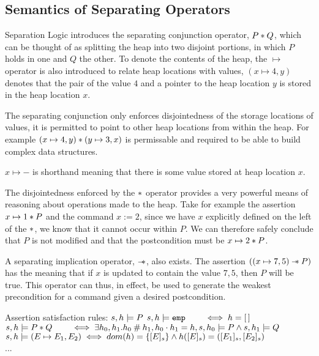 \documentclass[a4paper]{report}
\begin{document}
  \subsection{Semantics of Separating Operators}
  
  Separation Logic introduces the separating conjunction operator, $P \mathbin{*} Q$,
  which can be thought of as splitting the heap into two disjoint portions, in
  which $P$ holds in one and $Q$ the other. To denote the contents of the
  heap, the $\mapsto$ operator is also introduced to relate heap locations with
  values, $(x \mapsto 4, y)$ denotes that the pair of the value $4$ and a pointer
  to the heap location $y$ is stored in the heap location $x$.

  The separating conjunction only enforces disjointedness of the storage
  locations of values, it is permitted to point to other heap locations from
  within the heap. For example $(x \mapsto 4, y) \mathbin{*} (y \mapsto 3, x)$ is
  permissable and required to be able to build complex data structures.


  $x \mapsto -$ is shorthand meaning that there is some value stored at heap
  location $x$.

  The disjointedness enforced by the $\mathbin{*}$ operator provides a very powerful
  means of reasoning about operations made to the heap. Take for example the
  assertion $x \mapsto 1 \mathbin{*} P$ and the command $x := 2$, since we have $x$
  explicitly defined on the left of the $\mathbin{*}$, we know that it cannot occur
  within $P$. We can therefore safely conclude that $P$ is not modified and that
  the postcondition must be $x \mapsto 2 \mathbin{*} P$.

  A separating implication operator, $\mathbin{-\mkern-6mu *}$, also exists. The assertion $((x
  \mapsto 7, 5) \mathbin{-\mkern-6mu *} P)$ has the meaning that if $x$ is updated to contain the
  value $7, 5$, then $P$ will be true. This operator can thus, in effect, be
  used to generate the weakest precondition for a command given a desired
  postcondition.

  \begin{display}{Assertion satisfaction rules: $s,h \models P$}
    $s,h \models \texttt{emp} \qquad \iff h = [\,]$ \\
    $s,h \models P \mathbin{*} Q \qquad \iff \exists h_0, h_1.h_0 \mathbin{\#} h_1, h_0 \cdot
    h_1 = h, s, h_0 \models P \land s,h_1 \models Q$ \\
    $s,h \models (E \mapsto E_1, E_2) \iff dom(h) = \{[E]_s\} \land h([E]_s)
    = ([E_1]_s, [E_2]_s)$ \\
    ...
  \end{display}
\end{document}

